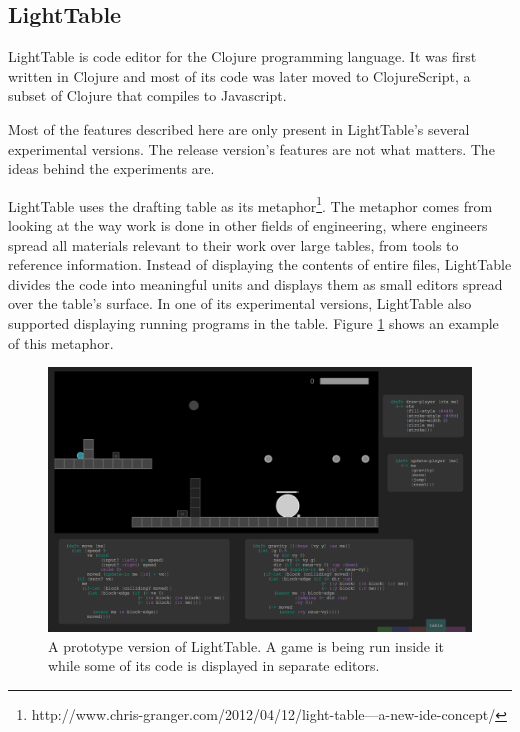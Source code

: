 \documentclass{./llncs2e/llncs}
\begin{document}
\subsection{LightTable}
	LightTable is code editor for the Clojure programming language\cite{hickey2008clojure}. It was first written in Clojure and most of its code was later moved to ClojureScript\cite{10.1109/MIC.2011.148}, a subset of Clojure that compiles to Javascript.

	Most of the features described here are only present in LightTable's several experimental versions. The release version's features are not what matters. The ideas behind the experiments are.

	LightTable uses the drafting table as its metaphor\footnote{http://www.chris-granger.com/2012/04/12/light-table---a-new-ide-concept/}. The metaphor comes from looking at the way work is done in other fields of engineering, where engineers spread all materials relevant to their work over large tables, from tools to reference information. 
	Instead of displaying the contents of entire files, LightTable divides the code into meaningful units and displays them as small editors spread over the table's surface. In one of its experimental versions, LightTable also supported displaying running programs in the table. Figure \ref{fig:lt:draft:table} shows an example of this metaphor.


	\begin{figure}
	  \centering
	  \includegraphics[width=1.0\textwidth]{img/lt_game_example}
	    \caption{A prototype version of LightTable. A game is being run inside it while some of its code is displayed in separate editors.}
	  \label{fig:lt:draft:table}
	\end{figure} 
\end{document}
